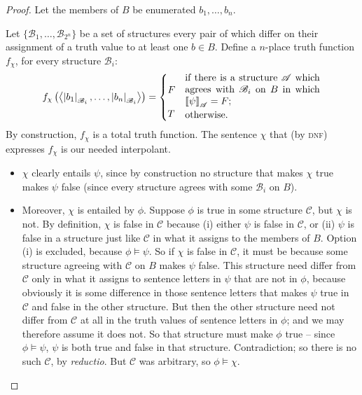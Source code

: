 \begin{proof} Let the members of $B$ be enumerated $b_{1},\ldots,b_{n}$. 

 Let $\{\mathscr{B}_{1},\ldots,\mathscr{B}_{2^{n}}\}$ be a set of structures every pair of which differ on their assignment of a truth value to at least one $b \in B$. Define a $n$-place truth function $f_{\chi}$, for every structure $\mathscr{B}_{i}$: \begin{equation*}
f_{\chi}\left(\left\langle\left|{b_{1}}\right|_{\mathscr{B}_{i}},\ldots,\left|{b_{n}}\right|_{\mathscr{B}_{i}}\right\rangle\right) =
 	 \begin{cases} F & \parbox[c]{.4\textwidth}{if there is a structure $\mathscr{A}$ which agrees with $\mathscr{B}_{i}$ on $B$ in which $\val{\psi}{A}=F$;}\\
T & \parbox[c]{.4\textwidth}{otherwise.}\end{cases}
 \end{equation*}
 By construction, $f_{\chi}$ is a total truth function. 
The sentence $\chi$ that (by \textsc{\lowercase{DNF}}) expresses $f_{\chi}$ is our needed interpolant.
\begin{itemize}
	\item $\chi$ clearly entails $\psi$, since by construction no structure that makes $\chi$ true makes $\psi$ false (since every structure agrees with some $\mathscr{B}_{i}$ on $B$). 
	\item  Moreover, $\chi$ is entailed by $\phi$. Suppose $\phi$ is true in some structure $\mathscr{C}$, but $\chi$ is not. By definition, $\chi$ is false in $\mathscr{C}$ because (i) either $\psi$ is false in $\mathscr{C}$, or (ii) $\psi$ is false in a structure just like $\mathscr{C}$ in what it assigns to the members of $B$. Option (i) is excluded, because  $\phi\vDash\psi$. So if $\chi$ is false in $\mathscr{C}$, it must be because some structure agreeing with $\mathscr{C}$ on $B$ makes $\psi$ false. This structure need differ from $\mathscr{C}$ only in what it assigns to sentence letters in $\psi$ that are not in $\phi$, because obviously it is some difference in those sentence letters that makes $\psi$ true in $\mathscr{C}$ and false in the other structure. But then the other structure need not differ from $\mathscr{C}$ at all in the truth values of sentence letters in $\phi$; and we may therefore assume it does not. So that structure must make $\phi$ true – since $\phi\vDash\psi$, $\psi$ is both true and false in that structure. Contradiction; so there is no such $\mathscr{C}$, by \emph{reductio}. But $\mathscr{C}$ was arbitrary, so  $\phi\vDash\chi$.
\end{itemize}  \end{proof}


